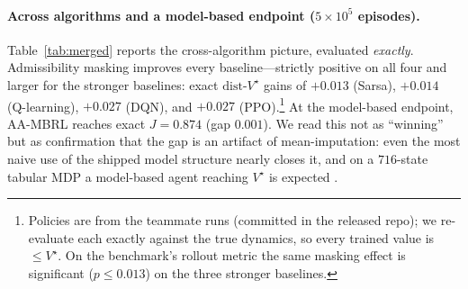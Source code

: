\documentclass{article}
\newcommand{\dist}{\mathrm{dist}\text{-}V^\star}
\begin{document}
\paragraph{Across algorithms and a model-based endpoint ($5{\times}10^5$ episodes).}
Table~\ref{tab:merged} reports the cross-algorithm picture, evaluated \emph{exactly}.
Admissibility masking improves every baseline---strictly positive on all four and
larger for the stronger baselines: exact $\dist$ gains of $+0.013$ (Sarsa), $+0.014$
(Q-learning), $+0.027$ (DQN), and $+0.027$ (PPO).\footnote{Policies are from the
teammate runs (committed in the released repo); we re-evaluate each exactly against
the true dynamics, so every trained value is $\le V^\star$. On the benchmark's rollout
metric the same masking effect is significant ($p\le0.013$) on the three stronger
baselines.} At the model-based endpoint, AA-MBRL reaches exact $J{=}0.874$ (gap
$0.001$). We read this not as ``winning'' but as confirmation that the gap is an
artifact of mean-imputation: even the most naive use of the shipped model structure
nearly closes it, and on a $716$-state tabular MDP a model-based agent reaching
$V^\star$ is expected \citep{auer2008ucrl,osband2013psrl}.
\end{document}

